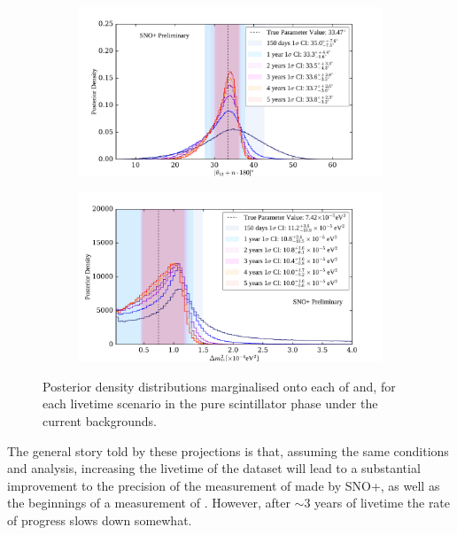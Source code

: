 \begin{figure}
    \centering
    \begin{subfigure}{0.98\textwidth}
        \centering
        \includegraphics[width=\textwidth]{6_SolarAnalysis/images/theta_12_comparison_projections.pdf}
        \caption{}
        \label{fig:1d_posteriors_projections_theta}
    \end{subfigure}
    \begin{subfigure}{0.98\textwidth}
        \centering
        \includegraphics[width=\textwidth]{6_SolarAnalysis/images/dmsq_21_comparison_projections.pdf}
        \caption{}
        \label{fig:1d_posteriors_projections_dmsq}
    \end{subfigure}
    \caption[Posterior density posterior distributions marginalised onto each of \tonetwo{} and \dmsq{}, for each livetime scenario]
        {Posterior density distributions marginalised onto each of \tonetwo{} and\dmsq{}, for each livetime scenario in the pure scintillator phase under the current backgrounds.}
    \label{fig:1d_posteriors_projections}
\end{figure}

The general story told by these projections is that, assuming the same conditions and analysis, increasing the livetime of the dataset will lead to a substantial improvement to the precision of the measurement of \tonetwo{} made by SNO+, as well as the beginnings of a measurement of \dmsq{}. However, after $\sim$3 years of livetime the rate of progress slows down somewhat.

